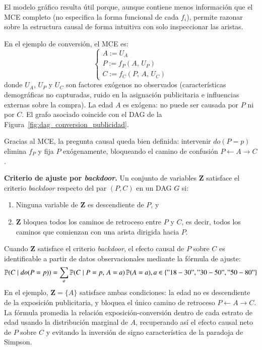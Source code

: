\documentclass[12pt]{report} %
\begin{document}
El modelo gráfico resulta útil porque, aunque contiene menos información que el MCE completo (no especifica la forma funcional de cada $f_i$), permite razonar sobre la estructura causal de forma intuitiva con solo inspeccionar las aristas.

En el ejemplo de conversión, el MCE es:
\begin{equation}
    \begin{cases}
        A := U_A          \\
        P := f_P(A,\,U_P) \\
        C := f_C(P,\,A,\,U_C)
    \end{cases}
    \label{eq:scm_conversion}
\end{equation}
donde $U_A$, $U_P$ y $U_C$ son factores exógenos no observados (características demográficas no capturadas, ruido en la asignación publicitaria e influencias externas sobre la compra). La edad $A$ es exógena: no puede ser causada por $P$ ni por $C$. El grafo asociado coincide con el DAG de la Figura~\ref{fig:dag_conversion_publicidad}.

Gracias al MCE, la pregunta causal queda bien definida: intervenir $do(P=p)$ elimina $f_P$ y fija $P$ exógenamente, bloqueando el camino de confusión $P \leftarrow A \rightarrow C$.

\textbf{Criterio de ajuste por \textit{backdoor}.} Un conjunto de variables $\mathbf{Z}$ satisface el criterio \textit{backdoor} respecto del par $(P, C)$ en un DAG $G$ si:
\begin{enumerate}
    \item Ninguna variable de $\mathbf{Z}$ es descendiente de $P$, y
    \item $\mathbf{Z}$ bloquea todos los caminos de retroceso entre $P$ y $C$, es decir, todos los caminos que comienzan con una arista dirigida hacia $P$.
\end{enumerate}
Cuando $\mathbf{Z}$ satisface el criterio \textit{backdoor}, el efecto causal de $P$ sobre $C$ es identificable a partir de datos observacionales mediante la fórmula de ajuste:
\begin{equation}
    \mathbb{P}(C \mid do(P=p))
    = \sum_{a} \mathbb{P}(C \mid P=p,\, A=a)\,\mathbb{P}(A=a), a \in \{"18-30", "30-50", "50-80"\}
    \label{eq:backdoor_scm_conversion}
\end{equation}
En el ejemplo, $\mathbf{Z} = \{A\}$ satisface ambas condiciones: la edad no es descendiente de la exposición publicitaria, y bloquea el único camino de retroceso $P \leftarrow A \rightarrow C$. La fórmula promedia la relación exposición-conversión dentro de cada estrato de edad usando la distribución marginal de $A$, recuperando así el efecto causal neto de $P$ sobre $C$ y evitando la inversión de signo característica de la paradoja de Simpson.
\end{document}
